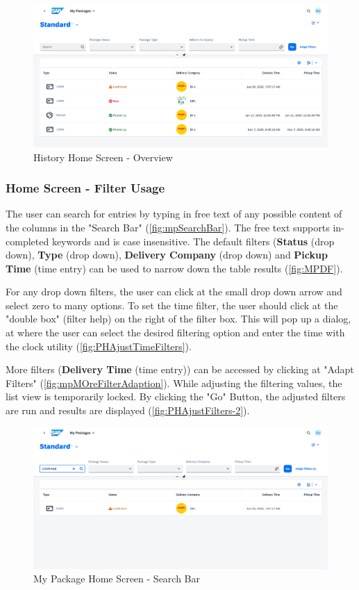 \begin{figure}[H]
	\centering
	\includegraphics[width=1\linewidth]{images/user_doc/myPack/overview.png}
	\caption{History Home Screen - Overview}
	\label{fig:HistoryHome}
\end{figure}

\subsubsection{Home Screen - Filter Usage}
The user can search for entries by typing in free text of any possible content of the columns in the "Search Bar" (\autoref{fig:mpSearchBar}). The free text supports in-completed keywords and is case insensitive. 
The default filters (\textbf{Status} (drop down), \textbf{Type} (drop down), \textbf{Delivery Company} (drop down) and \textbf{Pickup Time} (time entry) can be used to narrow down the table results (\autoref{fig:MPDF}). 

For any drop down filters, the user can click at the small drop down arrow and select zero to many options. To set the time filter, the user should click at the "double box" (filter help) on the right of the filter box. This will pop up a dialog, at where the user can select the desired filtering option and enter the time with the clock utility (\autoref{fig:PHAjustTimeFilters}). 

More filters (\textbf{Delivery Time} (time entry)) can be accessed by clicking at "Adapt Filters" (\autoref{fig:mpMOreFilterAdaption}). While adjusting the filtering values, the list view is temporarily locked. By clicking the "Go" Button, the adjusted filters are run and results are displayed (\autoref{fig:PHAjustFilters-2}).

\begin{figure}[htb!]
	\centering
	\includegraphics[width=0.9\linewidth]{images/user_doc/myPack/searchbar.png}
	\caption{My Package Home Screen - Search Bar}
	\label{fig:mpSearchBar}
\end{figure}


